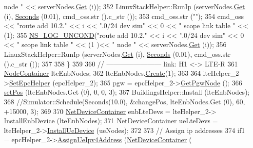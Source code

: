 \begin{DoxyCode}
{{{{       node "} << serverNodes.\hyperlink{classns3_1_1NodeContainer_a9ed96e2ecc22e0f5a3d4842eb9bf90bf}{Get} (i));
352     LinuxStackHelper::RunIp (serverNodes.\hyperlink{classns3_1_1NodeContainer_a9ed96e2ecc22e0f5a3d4842eb9bf90bf}{Get} (i), \hyperlink{group__timecivil_ga33c34b816f8ff6628e33d5c8e9713b9e}{Seconds} (0.01), cmd\_oss.str ().c\_str ());
353     cmd\_oss.str (\textcolor{stringliteral}{""});
354     cmd\_oss << \textcolor{stringliteral}{"route add 10.2."} << i << \textcolor{stringliteral}{".0/24 dev sim"} << 0 << \textcolor{stringliteral}{" scope link table "} << (1);
355     \hyperlink{log-macros-disabled_8h_a0b36e5e182b37194f85ef1c5e979fb2e}{NS\_LOG\_UNCOND}(\textcolor{stringliteral}{"route add 10.2."} << i << \textcolor{stringliteral}{".0/24 dev sim"} << 0 << \textcolor{stringliteral}{" scope link table "} << (1
      )<< \textcolor{stringliteral}{" node "} << serverNodes.\hyperlink{classns3_1_1NodeContainer_a9ed96e2ecc22e0f5a3d4842eb9bf90bf}{Get} (i));
356     LinuxStackHelper::RunIp (serverNodes.\hyperlink{classns3_1_1NodeContainer_a9ed96e2ecc22e0f5a3d4842eb9bf90bf}{Get} (i), \hyperlink{group__timecivil_ga33c34b816f8ff6628e33d5c8e9713b9e}{Seconds} (0.01), cmd\_oss.str ().c\_str ());
357 
358   \}
359 
360   \textcolor{comment}{// ------------------------ link: H1 <-> LTE-R}
361   \hyperlink{classns3_1_1NodeContainer}{NodeContainer} lteEnbNodes;
362   lteEnbNodes.\hyperlink{classns3_1_1NodeContainer_a787f059e2813e8b951cc6914d11dfe69}{Create}(1);
363 
364   lteHelper\_2->\hyperlink{classns3_1_1LteHelper_a324079a1ccd54ce949786b83d6b95915}{SetEpcHelper} (epcHelper\_2);
365   pgw = epcHelper\_2->\hyperlink{classns3_1_1PointToPointEpcHelper_a828ac04ae81b0e323f9ccfc08bcacf21}{GetPgwNode} ();
366   \hyperlink{dce-example-mptcp-mmwave_8cc_af9909077be6393b8cc46f5ac55a77f84}{setPos} (lteEnbNodes.Get (0), 0, 0, 3);
367   BuildingsHelper::Install (lteEnbNodes);
368   \textcolor{comment}{//Simulator::Schedule(Seconds(10.0), &changePos, lteEnbNodes.Get (0), 60, +15000, 3);}
369 
370   \hyperlink{classns3_1_1NetDeviceContainer}{NetDeviceContainer} enbLteDevs = lteHelper\_2->
      \hyperlink{classns3_1_1LteHelper_a5e009ad35ef85f46b5a6099263f15a03}{InstallEnbDevice} (lteEnbNodes);
371   \hyperlink{classns3_1_1NetDeviceContainer}{NetDeviceContainer} ueLteDevs = lteHelper\_2->\hyperlink{classns3_1_1LteHelper_ac9cd932d7de92811cfa953c2e3b2fc9f}{InstallUeDevice} (ueNodes);
372 
373   \textcolor{comment}{// Assign ip addresses}
374   if1 = epcHelper\_2->\hyperlink{classns3_1_1PointToPointEpcHelper_a11102d32127163fdcc47c44623d4f0cc}{AssignUeIpv4Address} (\hyperlink{classns3_1_1NetDeviceContainer}{NetDeviceContainer} (
}}}
\end{DoxyCode}
